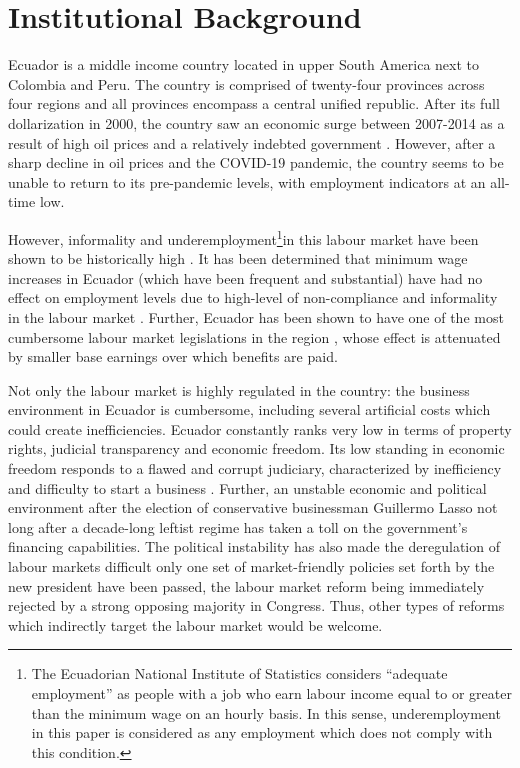 \documentclass[11pt,a4paper]{article}\usepackage[]{graphicx}\usepackage[]{xcolor}
\begin{document}
\section{Institutional Background}

Ecuador is a middle income country located in upper South America next to Colombia and Peru. The country is comprised of twenty-four provinces across four regions and all provinces encompass a central unified republic. After its full dollarization in 2000, the country saw an economic surge between 2007-2014 as a result of high oil prices and a relatively indebted government \parencite{Weisbrot.2017}. However, after a sharp decline in oil prices and the COVID-19 pandemic, the country seems to be unable to return to its pre-pandemic levels, with employment indicators at an all-time low. 

However, informality and underemployment\footnote{The Ecuadorian National Institute of Statistics considers ``adequate employment'' as people with a job who earn labour income equal to or greater than the minimum wage on an hourly basis. In this sense, underemployment in this paper is considered as any employment which does not comply with this condition.}in this labour market have been shown to be historically high \parencite{Meneses.2021, Chavez.2012, Mendoza.2020}. It has been determined that minimum wage increases in Ecuador (which have been frequent and substantial) have had no effect on employment levels due to high-level of non-compliance and informality in the labour market \parencite{Canelas.2014}. Further, Ecuador has been shown to have one of the most cumbersome labour market legislations in the region \parencite{MacIsaac.1997}, whose effect is attenuated by smaller base earnings over which benefits are paid.

Not only the labour market is highly regulated in the country: the business environment in Ecuador is cumbersome, including several artificial costs which could create inefficiencies. Ecuador constantly ranks very low in terms of property rights, judicial transparency and economic freedom. Its low standing in economic freedom responds to a flawed and corrupt judiciary, characterized by inefficiency and difficulty to start a business \textcite{Euromonitor.2022}. Further, an unstable economic and political environment after the election of conservative businessman Guillermo Lasso not long after a decade-long leftist regime has taken a toll on the government's financing capabilities. The political instability has also made the deregulation of labour markets difficult only one set of market-friendly policies set forth by the new president have been passed, the labour market reform being immediately rejected by a strong opposing majority in Congress. Thus, other types of reforms which indirectly target the labour market would be welcome. 
\end{document}
